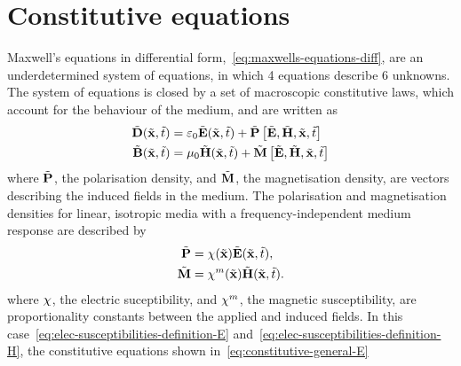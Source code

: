 \section{Constitutive equations}
\label{Ch:PhysicalProblem:ConstitutiveEquations}
Maxwell's equations in differential form,~\eqref{eq:maxwells-equations-diff},
are an underdetermined system of equations, in which 4 equations describe 6 unknowns. The
system of equations is closed by a set of macroscopic constitutive laws, which
account for the behaviour of the medium, and are written as
\begin{subequations}
  \begin{align}
    \tilde{\mathbf{D}}(\tilde{\mathbf{x}},\tilde{t}) &= \varepsilon_0 \tilde{\mathbf{E}}(\tilde{\mathbf{x}},\tilde{t}) + \tilde{\mathbf{P}}\left[ \tilde{\mathbf{E}}, \tilde{\mathbf{H}}, \tilde{\mathbf{x}}, \tilde{t} \right]  \label{eq:constitutive-general-E}\\
    \tilde{\mathbf{B}}(\tilde{\mathbf{x}},\tilde{t}) &= \mu_0 \tilde{\mathbf{H}}(\tilde{\mathbf{x}},\tilde{t}) + \tilde{\mathbf{M}}\left[ \tilde{\mathbf{E}}, \tilde{\mathbf{H}}, \tilde{\mathbf{x}}, \tilde{t} \right] \label{eq:constitutive-general-H}
  \end{align}
\end{subequations}
where $\tilde{\mathbf{P}}$, the polarisation density, and $\tilde{\mathbf{M}}$, the magnetisation
density, are vectors describing the induced fields in the medium.
The polarisation and magnetisation densities for linear, isotropic media with 
a frequency-independent medium response are described by
\begin{subequations}
  \begin{align}
    \tilde{\mathbf{P}} &= \chi(\tilde{\mathbf{x}}) \tilde{\mathbf{E}}(\tilde{\mathbf{x}},\tilde{t}), \label{eq:elec-susceptibilities-definition-E} \\
    \tilde{\mathbf{M}} &= \chi^{m}(\tilde{\mathbf{x}}) \tilde{\mathbf{H}}(\tilde{\mathbf{x}},\tilde{t}) . \label{eq:elec-susceptibilities-definition-H} 
  \end{align}
\end{subequations}
where $\chi$, the electric suceptibility, and $\chi^{m}$, the
magnetic susceptibility, are proportionality constants
between the applied and induced fields.
In this case~\eqref{eq:elec-susceptibilities-definition-E}
and~\eqref{eq:elec-susceptibilities-definition-H}, the constitutive equations
shown in~\eqref{eq:constitutive-general-E}
